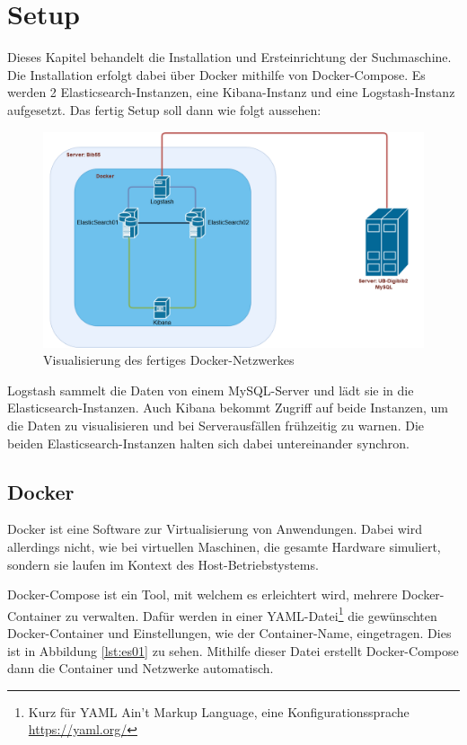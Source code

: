 \chapter{Setup}

Dieses Kapitel behandelt die Installation und Ersteinrichtung der Suchmaschine. Die Installation erfolgt dabei über Docker mithilfe von Docker-Compose. Es werden 2 Elasticsearch-Instanzen, eine Kibana-Instanz und eine Logstash-Instanz aufgesetzt. Das fertig Setup soll dann wie folgt aussehen:

\begin{figure}
	\centering
	\includegraphics[width=1\linewidth]{images/docker_structure.png}
	\caption{Visualisierung des fertiges Docker-Netzwerkes}
	\label{img:dockerNetwork}
\end{figure}

Logstash sammelt die Daten von einem MySQL-Server und lädt sie in die Elasticsearch-Instanzen. Auch Kibana bekommt Zugriff auf beide Instanzen, um die Daten zu visualisieren und bei Serverausfällen frühzeitig zu warnen. Die beiden Elasticsearch-Instanzen halten sich dabei untereinander synchron. 

\section{Docker}

Docker ist eine Software zur Virtualisierung von Anwendungen. Dabei wird allerdings nicht, wie bei virtuellen Maschinen, die gesamte Hardware simuliert, sondern sie laufen im Kontext des Host-Betriebstystems.

Docker-Compose ist ein Tool, mit welchem es erleichtert wird, mehrere Docker-Container zu verwalten. Dafür werden in einer YAML-Datei\footnote{Kurz für YAML Ain't Markup Language, eine Konfigurationssprache \url{https://yaml.org/}} die gewünschten Docker-Container und Einstellungen, wie der Container-Name, eingetragen. Dies ist in Abbildung \ref{lst:es01} zu sehen. Mithilfe dieser Datei erstellt Docker-Compose dann die Container und Netzwerke automatisch.

